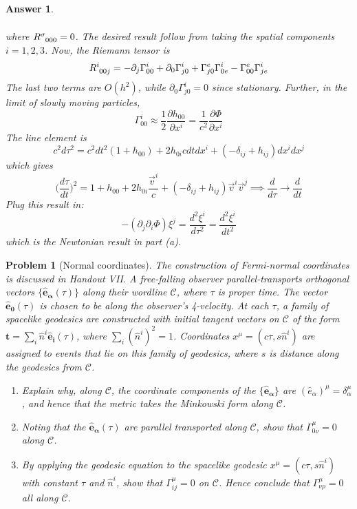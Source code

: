 \documentclass[a4paper]{article}
\theoremstyle{new2}
\newtheorem{ans}{Answer}[section]
\theoremstyle{new}
\newtheorem{qns}{Problem}[section]
\begin{document}
\begin{ans}
\begin{enumerate}[label=(\alph*)]
\begin{align}
\end{align}
where $\tensor*{R}{*_{}^{\sigma}_{000}}=0$. The desired result follow from taking the spatial components $i=1,2,3$. Now, the Riemann tensor is
$$\tensor*{R}{*_{}^{i}_{00j}}=-\partial_j\Gamma^i_{00}+\partial_0\Gamma^i_{j0}+\Gamma^e_{j0}\Gamma^i_{0e}-\Gamma^e_{00}\Gamma^i_{je}$$
The last two terms are $O(h^2)$, while $\partial_0\Gamma^i_{j0}=0$ since stationary. Further, in the limit of slowly moving particles, 
$$\Gamma^i_{00}\approx\frac{1}{2}\frac{\partial h_{00}}{\partial x^i}=\frac{1}{c^2}\frac{\partial\Phi}{\partial x^i}$$
The line element is
$$c^2d\tau^2=c^2dt^2(1+h_{00})+2h_{0i}cdtdx^i+(-\delta_{ij}+h_{ij})dx^idx^j$$
which gives
$$\bigg(\frac{d\tau}{dt}\bigg)^2=1+h_{00}+2h_{0i}\frac{\vec{v}^i}{c}+(-\delta_{ij}+h_{ij})\vec{v}^i\vec{v}^j\implies \frac{d}{d\tau}\rightarrow\frac{d}{dt}$$
Plug this result in:
$$-(\partial_j\partial_i\Phi)\xi^j=\frac{d^2\xi^i}{d\tau^2}=\frac{d^2\xi^i}{dt^2}$$
which is the Newtonian result in part (a).
\end{enumerate}
\end{ans}
\newpage
\begin{qns}[Normal coordinates]
The construction of Fermi-normal coordinates is discussed in Handout VII. A free-falling observer parallel-transports orthogonal vectors $\{\mathbf{\hat{e}_\alpha}(\tau)\}$ along their wordline $\mathcal{C}$, where $\tau$ is proper time. The vector $\mathbf{\hat{e}_0}(\tau)$ is chosen to be along the observer’s 4-velocity. At each $\tau$, a family of spacelike geodesics are constructed with initial tangent vectors on $\mathcal{C}$ of the form $\mathbf{t}=\sum_i\hat{n}^i\mathbf{\hat{e}_i}(\tau)$, where $\sum_i(\hat{n}^i)^2=1$. Coordinates $x^\mu=(c\tau,s\hat{n}^i)$ are assigned to events that lie on this family of geodesics, where $s$ is distance along the geodesics from $\mathcal{C}$. 
\begin{enumerate}[label=(\alph*)]
\item Explain why, along $\mathcal{C}$, the coordinate components of the $\{\mathbf{\hat{e}_\alpha}\}$ are $(\hat{e}_\alpha)^\mu=\delta^\mu_\alpha$, and hence that the metric takes the Minkowski form along $\mathcal{C}$.
\item Noting that the $\mathbf{\hat{e}_\alpha}(\tau)$ are parallel transported along $\mathcal{C}$, show that $\Gamma^\mu_{0\nu}=0$ along $\mathcal{C}$.
\item By applying the geodesic equation to the spacelike geodesic $x^\mu=(c\tau,s\hat{n}^i)$with constant $\tau$ and $\hat{n}^i$, show that $\Gamma_{ij}^\mu=0$ on $\mathcal{C}$. Hence conclude that $\Gamma_{\nu\rho}^\mu=0$ all along $\mathcal{C}$.
\end{enumerate}
\end{qns}
\end{document}

